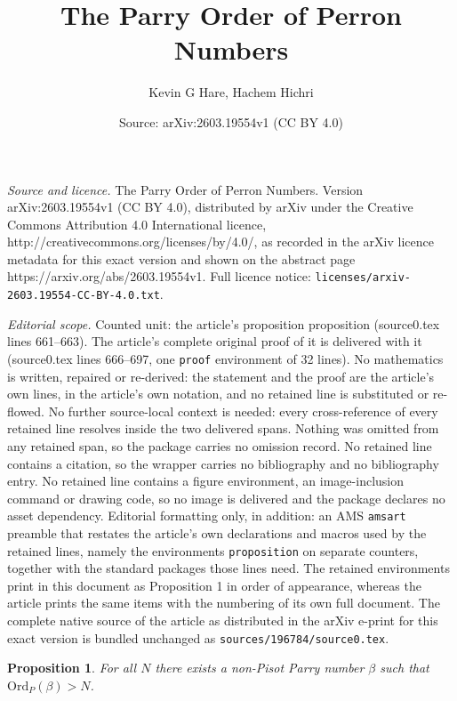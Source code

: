 \documentclass[10pt,a4paper]{amsart}
\title{The Parry Order of Perron Numbers}
\author{Kevin G Hare, Hachem Hichri}
\date{Source: arXiv:2603.19554v1 (CC BY 4.0)}
\newtheorem{proposition}{Proposition}
\newcommand{\OrdP}{\mathrm{Ord}_{P}}
\begin{document}
\maketitle

\noindent\emph{Source and licence.} The Parry Order of Perron Numbers. Version arXiv:2603.19554v1 (CC BY 4.0), distributed by arXiv under the Creative Commons Attribution 4.0 International licence, http://creativecommons.org/licenses/by/4.0/, as recorded in the arXiv licence metadata for this exact version and shown on the abstract page https://arxiv.org/abs/2603.19554v1. Full licence notice: \texttt{licenses/arxiv-2603.19554-CC-BY-4.0.txt}.\par\smallskip

\noindent\textit{Editorial scope.} Counted unit: the article's proposition proposition (source0.tex lines 661--663). The article's complete original proof of it is delivered with it (source0.tex lines 666--697, one \texttt{proof} environment of 32 lines). No mathematics is written, repaired or re-derived: the statement and the proof are the article's own lines, in the article's own notation, and no retained line is substituted or re-flowed.  No further source-local context is needed: every cross-reference of every retained line resolves inside the two delivered spans.  Nothing was omitted from any retained span, so the package carries no omission record.  No retained line contains a citation, so the wrapper carries no bibliography and no bibliography entry.  No retained line contains a figure environment, an image-inclusion command or drawing code, so no image is delivered and the package declares no asset dependency.  Editorial formatting only, in addition: an AMS \texttt{amsart} preamble that restates the article's own declarations and macros used by the retained lines, namely the environments \texttt{proposition} on separate counters, together with the standard packages those lines need.  The retained environments print in this document as Proposition 1 in order of appearance, whereas the article prints the same items with the numbering of its own full document.  The complete native source of the article as distributed in the arXiv e-print for this exact version is bundled unchanged as \texttt{sources/196784/source0.tex}.
\begin{proposition}
    For all $N$ there exists a non-Pisot Parry number $\beta$ such that $\OrdP(\beta) > N$.
\end{proposition}
\end{document}

